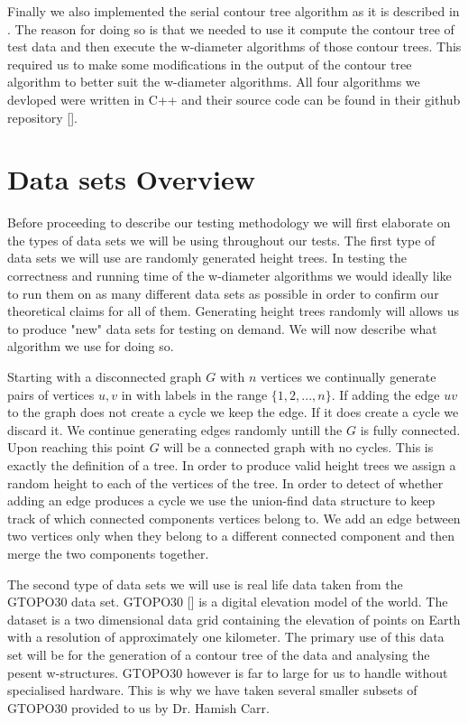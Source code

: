 Finally we also implemented the serial contour tree algorithm as it is described in \cite{ct-big-paper}. The reason for doing so is that we needed to use it compute the contour tree of test data and then execute the w-diameter algorithms of those contour trees. This required us to make some modifications in the output of the contour tree algorithm to better suit the w-diameter algorithms. All four algorithms we devloped were written in C++ and their source code can be found in their github repository [].

\section{Data sets Overview}

Before proceeding to describe our testing methodology we will first elaborate on the types of data sets we will be using throughout our tests. The first type of data sets we will use are randomly generated height trees. In testing the correctness and running time of the w-diameter algorithms we would ideally like to run them on as many different data sets as possible in order to confirm our theoretical claims for all of them. Generating height trees randomly will allows us to produce "new" data sets for testing on demand. We will now describe what algorithm we use for doing so.

Starting with a disconnected graph $G$ with $n$ vertices we continually generate pairs of vertices $u, v$ in with labels in the range $\{1, 2, ..., n\}$. If adding the edge $uv$ to the graph does not create a cycle we keep the edge. If it does create a cycle we discard it. We continue generating edges randomly untill the $G$ is fully connected. Upon reaching this point $G$ will be a connected graph with no cycles. This is exactly the definition of a tree. In order to produce valid height trees we assign a random height to each of the vertices of the tree. In order to detect of whether adding an edge produces a cycle we use the union-find data structure to keep track of which connected components vertices belong to. We add an edge between two vertices only when they belong to a different connected component and then merge the two components together.

The second type of data sets we will use is real life data taken from the GTOPO30 data set. GTOPO30 [] is a digital elevation model of the world. The dataset is a two dimensional data grid containing the elevation of points on Earth with a resolution of approximately one kilometer. The primary use of this data set will be for the generation of a contour tree of the data and analysing the pesent w-structures. GTOPO30 however is far to large for us to handle without specialised hardware. This is why we have taken several smaller subsets of GTOPO30 provided to us by Dr. Hamish Carr.

